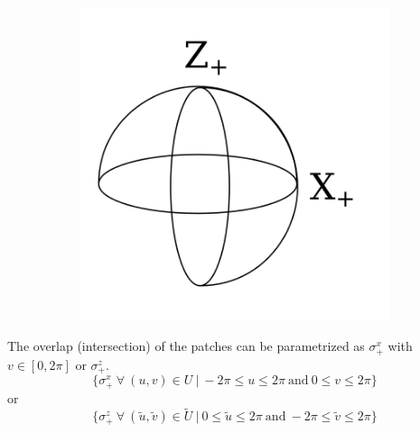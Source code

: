 \documentclass[12pt]{article}
\begin{document}
\begin{figure}[h!]
  \centering
      \begin{subfigure}[b]{0.3\linewidth}
    \includegraphics[width=\linewidth]{./assets/4-2-2/s2-patches-intersection.png}
  \end{subfigure}
  \end{figure}
	\indent

The overlap (intersection) of the patches can be parametrized as $\sigma^{x}_{+}$ with $v \in [0,2\pi]$ or $\sigma^{z}_{+}$.
$$
\lbrace \sigma^{x}_{+}  \ \forall \ (u, v) \in U  \ | \ -2\pi \leq u \leq 2\pi  \ \textrm{and} \ 0 \leq v \leq 2\pi  \rbrace
$$
\indent
or
$$
\lbrace \sigma^{z}_{+}  \ \forall \ (\tilde u, \tilde v) \in \widetilde{U}  \ | \  0 \leq \tilde u \leq 2\pi  \ \textrm{and} \ -2\pi \leq \tilde v \leq 2\pi \rbrace
$$
\end{document}
